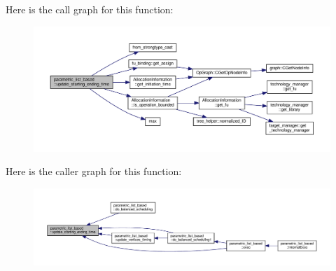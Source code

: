 Here is the call graph for this function\+:
\nopagebreak
\begin{figure}[H]
\begin{center}
\leavevmode
\includegraphics[width=350pt]{d7/d47/classparametric__list__based_a86a22e0ca2f49d25402fd437d8be06a3_cgraph}
\end{center}
\end{figure}
Here is the caller graph for this function\+:
\nopagebreak
\begin{figure}[H]
\begin{center}
\leavevmode
\includegraphics[width=350pt]{d7/d47/classparametric__list__based_a86a22e0ca2f49d25402fd437d8be06a3_icgraph}
\end{center}
\end{figure}
\mbox{\label{classparametric__list__based_a155c333d3654eb3f35cc055b6b97265c}} 
